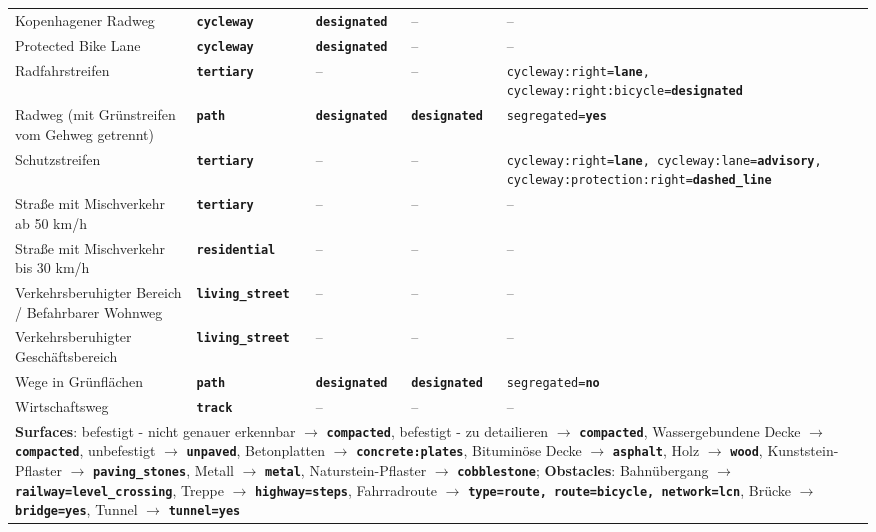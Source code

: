 \begin{table}[h]
{\begin{tabular}{p{8.5cm}p{3cm}p{3cm}p{3cm}p{6cm}}
    Kopenhagener Radweg & \texttt{\textbf{cycleway}} & \texttt{\textbf{designated}} & -- & -- \\
    Protected Bike Lane & \texttt{\textbf{cycleway}} & \texttt{\textbf{designated}} & -- & -- \\
    Radfahrstreifen & \texttt{\textbf{tertiary}} & -- & -- & \texttt{cycleway:right=\textbf{lane}, cycleway:right:bicycle=\textbf{\allowbreak designated}} \\
    Radweg (mit Grünstreifen vom Gehweg getrennt) & \texttt{\textbf{path}} & \texttt{\textbf{designated}} & \texttt{\textbf{designated}} & \texttt{segregated=\textbf{yes}} \\
    Schutzstreifen & \texttt{\textbf{tertiary}} & -- & -- & \texttt{cycleway:right=\textbf{lane}, cycleway:lane=\textbf{advisory}, cycleway:protection:\allowbreak right=\textbf{dashed\_line}} \\
    Straße mit Mischverkehr ab 50 km/h & \texttt{\textbf{tertiary}} & -- & -- & -- \\
    Straße mit Mischverkehr bis 30 km/h & \texttt{\textbf{residential}} & -- & -- & -- \\
    Verkehrsberuhigter Bereich / Befahrbarer Wohnweg & \texttt{\textbf{living\_street}} & -- & -- & -- \\
    Verkehrsberuhigter Geschäftsbereich & \texttt{\textbf{living\_street}} & -- & -- & -- \\
    Wege in Grünflächen & \texttt{\textbf{path}} & \texttt{\textbf{designated}} & \texttt{\textbf{designated}} & \texttt{segregated=\textbf{no}} \\
    Wirtschaftsweg & \texttt{\textbf{track}} & -- & -- & -- \\
    \hline
    \multicolumn{5}{p{25cm}}{\textbf{Surfaces}: befestigt - nicht genauer erkennbar $\rightarrow$ \texttt{\textbf{compacted}}, befestigt - zu detailieren $\rightarrow$ \texttt{\textbf{compacted}}, Wassergebundene Decke $\rightarrow$ \texttt{\textbf{compacted}}, unbefestigt $\rightarrow$ \texttt{\textbf{unpaved}}, Betonplatten $\rightarrow$ \texttt{\textbf{concrete:plates}}, Bituminöse Decke $\rightarrow$ \texttt{\textbf{asphalt}}, Holz $\rightarrow$ \texttt{\textbf{wood}}, Kunststein-Pflaster $\rightarrow$ \texttt{\textbf{paving\_stones}}, Metall $\rightarrow$ \texttt{\textbf{metal}}, Naturstein-Pflaster $\rightarrow$ \texttt{\textbf{cobblestone}}; \textbf{Obstacles}: Bahnübergang $\rightarrow$ \texttt{\textbf{railway=level\_crossing}}, Treppe $\rightarrow$ \texttt{\textbf{highway=steps}}, Fahrradroute $\rightarrow$ \texttt{\textbf{type=route, route=bicycle, network=lcn}}, Brücke $\rightarrow$ \texttt{\textbf{bridge=yes}}, Tunnel $\rightarrow$ \texttt{\textbf{tunnel=yes}}}. \\
\end{tabular}
}
\end{table}

